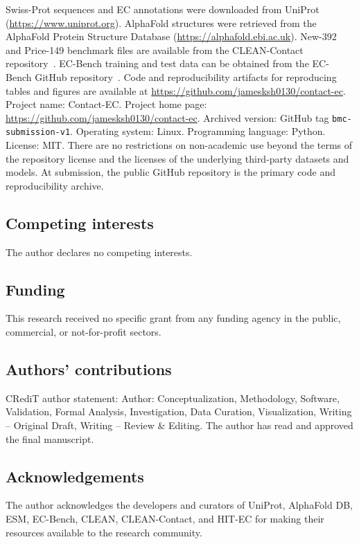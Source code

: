 \documentclass[numbered,contemporary,mediumone]{oup-authoring-template}
\begin{document}
Swiss-Prot sequences and EC annotations were downloaded from
UniProt~\citep{uniprot2023} (\url{https://www.uniprot.org}). AlphaFold structures were retrieved from the
AlphaFold Protein Structure Database (\url{https://alphafold.ebi.ac.uk}).
New-392 and Price-149 benchmark files are available from the CLEAN-Contact
repository~\citep{ayres2024}. EC-Bench training and test data can be obtained from the EC-Bench
GitHub repository~\citep{davoudi2026}. Code and reproducibility artifacts for reproducing tables
and figures are available at \url{https://github.com/jamesksh0130/contact-ec}.
Project name: Contact-EC. Project home page:
\url{https://github.com/jamesksh0130/contact-ec}. Archived version:
GitHub tag \texttt{bmc-submission-v1}. Operating system:
Linux. Programming language: Python. License: MIT. There are no restrictions
on non-academic use beyond the terms of the repository license and the licenses
of the underlying third-party datasets and models. At submission, the public
GitHub repository is the primary code and reproducibility archive.

\subsection*{Competing interests}
The author declares no competing interests.

\subsection*{Funding}
This research received no specific grant from any funding agency in the public,
commercial, or not-for-profit sectors.

\subsection*{Authors' contributions}
CRediT author statement: Author: Conceptualization, Methodology,
Software, Validation, Formal Analysis, Investigation, Data Curation,
Visualization, Writing -- Original Draft, Writing -- Review \& Editing.
The author has read and approved the final manuscript.

\subsection*{Acknowledgements}
The author acknowledges the developers and curators of UniProt, AlphaFold DB,
ESM, EC-Bench, CLEAN, CLEAN-Contact, and HIT-EC for making their resources
available to the research community.



\end{document}
